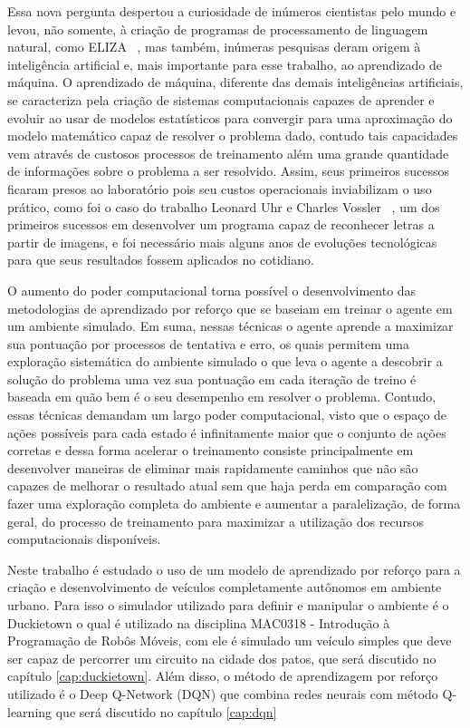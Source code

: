Essa nova pergunta despertou a curiosidade de inúmeros cientistas pelo mundo e levou, não somente, à criação de programas de processamento de linguagem natural, como ELIZA ~\citep{weizenbaum1966eliza}, mas também, inúmeras pesquisas deram origem à inteligência artificial e, mais importante para esse trabalho, ao aprendizado de máquina. O aprendizado de máquina, diferente das demais inteligências artificiais, se caracteriza pela criação de sistemas computacionais capazes de aprender e evoluir ao usar de modelos estatísticos para convergir para uma aproximação do modelo matemático capaz de resolver o problema dado, contudo tais capacidades vem através de custosos processos de treinamento além uma grande quantidade de informações sobre o problema a ser resolvido. Assim, seus primeiros sucessos ficaram presos ao laboratório pois seu custos operacionais inviabilizam o uso prático, como foi o caso do trabalho Leonard Uhr e Charles Vossler ~\citep{Uhr_Vossler_1961}, um dos primeiros sucessos em desenvolver um programa capaz de reconhecer letras a partir de imagens, e foi necessário mais alguns anos de evoluções tecnológicas para que seus resultados fossem aplicados no cotidiano.

O aumento do poder computacional torna possível o desenvolvimento das metodologias de aprendizado por reforço que se baseiam em treinar o agente em um ambiente simulado. Em suma, nessas técnicas o agente aprende a maximizar sua pontuação por processos de tentativa e erro, os quais permitem uma exploração sistemática do ambiente simulado o que leva o agente a descobrir a solução do problema uma vez sua pontuação em cada iteração de treino é baseada em quão bem é o seu desempenho em resolver o problema. Contudo, essas técnicas demandam um largo poder computacional, visto que o espaço de ações possíveis para cada estado é infinitamente maior que o conjunto de ações corretas e dessa forma acelerar o treinamento consiste principalmente em desenvolver maneiras de eliminar mais rapidamente caminhos que não são capazes de melhorar o resultado atual sem que haja perda em comparação com fazer uma exploração completa do ambiente e aumentar a paralelização, de forma geral, do processo de treinamento para maximizar a utilização dos recursos computacionais disponíveis.

Neste trabalho é estudado o uso de um modelo de aprendizado por reforço para a criação e desenvolvimento de veículos completamente autônomos em ambiente urbano. Para isso o simulador utilizado para definir e manipular o ambiente é o Duckietown o qual é utilizado na disciplina MAC0318 - Introdução à Programação de Robôs Móveis, com ele é simulado um veículo simples que deve ser capaz de percorrer um circuito na cidade dos patos, que será discutido no capítulo \ref{cap:duckietown}. Além disso, o método de aprendizagem por reforço utilizado é o Deep Q-Network (DQN) que combina redes neurais com método Q-learning que será discutido no capítulo \ref{cap:dqn}

